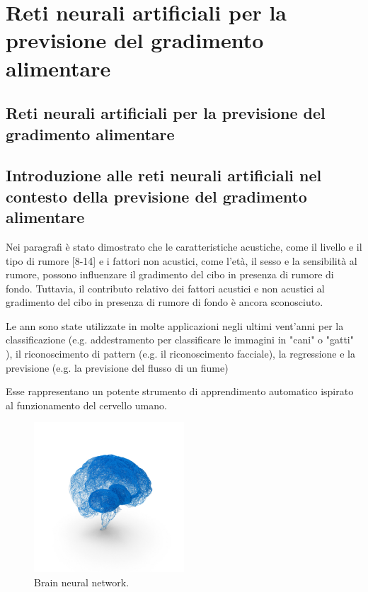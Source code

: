 
%

\chapter{Reti neurali artificiali per la previsione del gradimento alimentare}


\section{Reti neurali artificiali per la previsione del gradimento alimentare}

\section{Introduzione alle reti neurali artificiali nel contesto della previsione del gradimento alimentare}
\noindent

Nei paragrafi è stato dimostrato che le caratteristiche acustiche, come il livello e il tipo di rumore [8-14] e i fattori non acustici, come l'età, il sesso e la sensibilità al rumore, possono influenzare il gradimento del cibo in presenza di rumore di fondo. Tuttavia, il contributo relativo dei fattori acustici e non acustici al gradimento del cibo in presenza di rumore di fondo è ancora sconosciuto.

Le \gls{ann} sono state utilizzate in molte applicazioni negli ultimi vent'anni per la classificazione (e.g. addestramento per classificare le immagini in "cani" o "gatti" ), il riconoscimento di pattern (e.g. il riconoscimento facciale), la regressione e la previsione (e.g. la previsione del flusso di un fiume) %

Esse rappresentano un potente strumento di apprendimento automatico ispirato al funzionamento del cervello umano. 

\begin{figure}[H]
    \centering
    \includegraphics[width=0.5\textwidth]{Chapters/Figures/brain.png}
    \caption{\small Brain neural network.}
    \label{fig:brain}
\end{figure}

